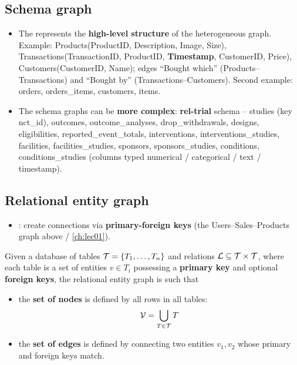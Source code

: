 \subsection{Schema graph}\label{sec:lec12-schema}

\begin{itemize}
  \item The  represents the \textbf{high-level structure} of the
    heterogeneous graph. Example: Products(ProductID, Description, Image, Size),
    Transactions(TransactionID, ProductID, \textbf{Timestamp}, CustomerID, Price),
    Customers(CustomerID, Name); edges ``Bought which'' (Products--Transactions) and
    ``Bought by'' (Transactions--Customers). Second example: orders, orders\_items,
    customers, items.
  \item \raggedright The schema graphs can be \textbf{more complex}: \textbf{rel-trial} schema --
    studies (key nct\_id), outcomes, outcome\_analyses, drop\_withdrawals, designs,
    eligibilities, reported\_event\_totals, interventions, interventions\_studies,
    facilities, facilities\_studies, sponsors, sponsors\_studies, conditions,
    conditions\_studies (columns typed numerical / categorical / text / timestamp).
\end{itemize}

\subsection{Relational entity graph}\label{sec:lec12-entity}

\begin{itemize}
  \item {}: create connections via \textbf{primary-foreign
    keys} (the Users--Sales--Products graph above / \cref{ch:lec01}).
\end{itemize}

\begin{definition}\label{def:lec12-reg}
  Given a database of tables $\mathcal{T}=\{T_1,\dots,T_n\}$ and relations
  $\mathcal{L}\subseteq\mathcal{T}\times\mathcal{T}$, where each table is a set of entities $v\in T_i$
  possessing a \textbf{primary key} and optional \textbf{foreign keys}, the relational
  entity graph is such that
  \begin{itemize}
    \item the \textbf{set of nodes} is defined by all rows in all tables:
      \begin{equation}\label{eq:lec12-nodes}
        \mathcal{V}=\bigcup_{T\in\mathcal{T}}T
      \end{equation}
    \item the \textbf{set of edges} is defined by connecting two entities $v_1,v_2$ whose
      primary and foreign keys match.
  \end{itemize}
\end{definition}

